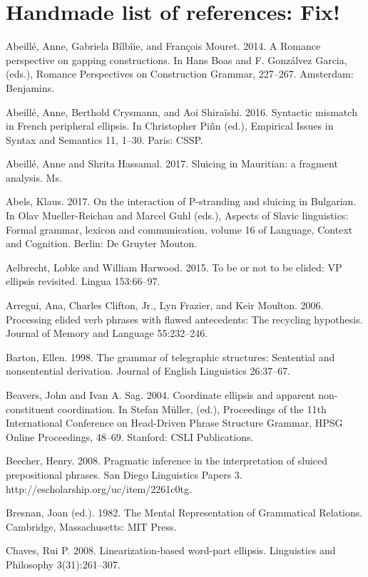 \documentclass[output=paper
                ,modfonts
                ,nonflat
	        ,collection
	        ,collectionchapter
	        ,collectiontoclongg
 	        ,biblatex
                ,babelshorthands
                ,newtxmath
                ,draftmode
                ,colorlinks, citecolor=brown
]{./langsci/langscibook}
\begin{document}
\section{Handmade list of references: Fix!}
\begin{description}
\item Abeill\'{e}, Anne, Gabriela B\^{i}lb\^{i}ie, and Fran\c{c}ois Mouret. 2014. A Romance perspective on
gapping constructions. In Hans Boas and F. Gonz\'{a}lvez Garcia, (eds.), Romance Perspectives
on Construction Grammar, 227--267. Amsterdam: Benjamins.
\item Abeill\'{e}, Anne, Berthold Crysmann, and Aoi Shira\"{i}shi. 2016. Syntactic mismatch in French peripheral ellipsis. In Christopher Pi\~{n}n (ed.), Empirical Issues in Syntax and Semantics 11, 1--30. Paris: CSSP.
\item Abeill\'{e}, Anne and Shrita Hassamal. 2017. Sluicing in Mauritian: a fragment analysis. Ms.
\item Abels, Klaus. 2017. On the interaction of P-stranding and sluicing in Bulgarian. In Olav Mueller-Reichau and Marcel Guhl (eds.), Aspects of Slavic linguistics: Formal grammar, lexicon and communication, volume 16 of Language, Context and Cognition. Berlin: De Gruyter Mouton.
\item Aelbrecht, Lobke and William Harwood. 2015. To be or not to be elided: VP ellipsis revisited. Lingua 153:66--97.
\item Arregui, Ana, Charles Clifton, Jr., Lyn Frazier, and Keir Moulton. 2006. Processing elided
verb phrases with flawed antecedents: The recycling hypothesis. Journal of Memory and
Language 55:232--246.
\item Barton, Ellen. 1998. The grammar of telegraphic structures: Sentential and nonsentential derivation. Journal of English Linguistics 26:37--67.
\item Beavers, John and Ivan A. Sag. 2004. Coordinate ellipsis and apparent non-constituent
coordination. In Stefan M\"{u}ller, (ed.), Proceedings of the 11th International Conference on
Head-Driven Phrase Structure Grammar, HPSG Online Proceedings, 48--69. Stanford: CSLI Publications.
\item Beecher, Henry. 2008. Pragmatic inference in the interpretation of sluiced prepositional
phrases. San Diego Linguistics Papers 3. http://escholarship.org/uc/item/2261c0tg.
\item Bresnan, Joan (ed.). 1982. The Mental Representation of Grammatical Relations. Cambridge, Massachusetts: MIT Press.
\item Chaves, Rui P. 2008. Linearization-based word-part ellipsis. Linguistics and Philosophy 3(31):261--307.

\end{description}
\end{document}

